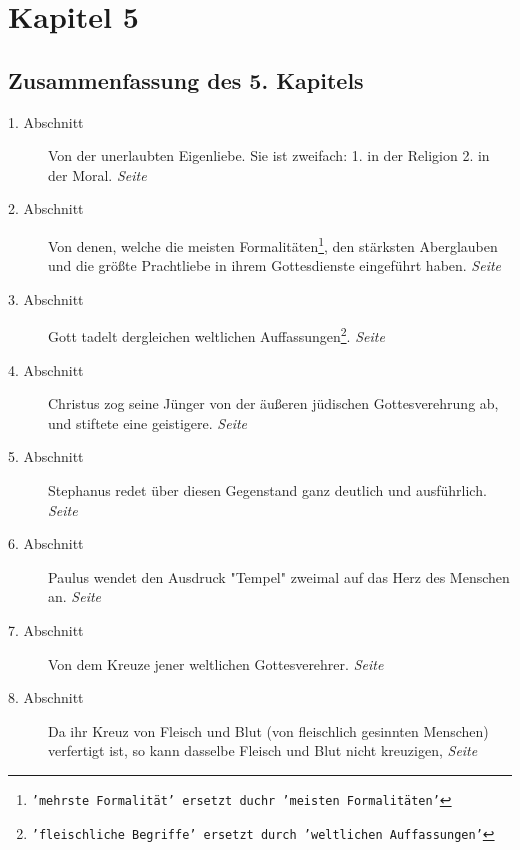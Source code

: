 

\chapter{Kapitel 5} \label{kap5}

\section{Zusammenfassung des 5. Kapitels}

\begin{description}
\item[1. Abschnitt] Von der unerlaubten Eigenliebe. Sie ist zweifach: 1. in der
Religion 2. in der Moral.
\dotfill \textit{Seite~\pageref{kap5_ab1}}\\
\item[2. Abschnitt] Von denen, welche die meisten
Formalitäten\footnote{\texttt{'mehrste Formalität' ersetzt duchr 'meisten
Formalitäten'}}, den
stärksten
Aberglauben und die größte Prachtliebe in ihrem Gottesdienste eingeführt haben.
\dotfill \textit{Seite~\pageref{kap5_ab2}}\\
\item[3. Abschnitt] Gott tadelt dergleichen weltlichen
Auffassungen\footnote{\texttt{'fleischliche Begriffe' ersetzt durch 'weltlichen
Auffassungen'}}.
\dotfill \textit{Seite~\pageref{kap5_ab3}}\\
\item[4. Abschnitt] Christus zog seine Jünger von der äußeren jüdischen
Gottesverehrung ab, und stiftete eine geistigere.
\dotfill \textit{Seite~\pageref{kap5_ab4}}\\
\item[5. Abschnitt] Stephanus redet über diesen Gegenstand ganz deutlich und
ausführlich.
\dotfill \textit{Seite~\pageref{kap5_ab5}}\\
\item[6. Abschnitt] Paulus wendet den Ausdruck "Tempel" zweimal auf das Herz des
Menschen an.
\dotfill \textit{Seite~\pageref{kap5_ab6}}\\
\item[7. Abschnitt] Von dem Kreuze jener weltlichen Gottesverehrer.
\dotfill \textit{Seite~\pageref{kap5_ab7}}\\
\item[8. Abschnitt] Da ihr Kreuz von Fleisch und Blut (von fleischlich gesinnten
Menschen) verfertigt ist, so kann dasselbe Fleisch und Blut nicht kreuzigen,
\dotfill \textit{Seite~\pageref{kap5_ab8}}\\

\end{description}
